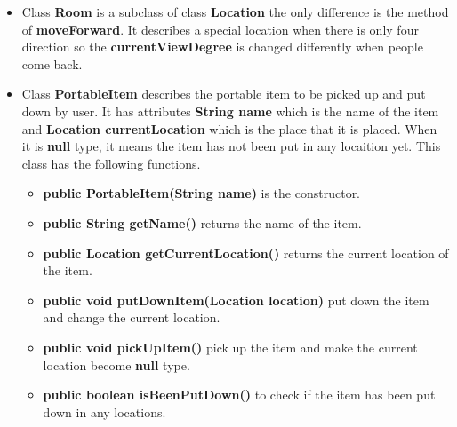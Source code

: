 \documentclass[11pt]{article}
\begin{document}
\begin{itemize}
\begin{itemize}
	\end{itemize}
	
	\item Class {\bf Room} is a subclass of class {\bf Location} the only difference is the method of {\bf moveForward}. It describes a special location when there is only four direction so the {\bf currentViewDegree} is changed differently when people come back.
	\item Class {\bf PortableItem} describes the portable item to be picked up and put down by user. It has attributes {\bf String name} which is the name of the item and {\bf Location currentLocation } which is the place that it is placed. When it is {\bf null} type, it means the item has not been put in any locaition yet. This class has the following functions.
		\begin{itemize}
			\item {\bf public PortableItem(String name)} is the constructor.
			\item {\bf public String getName()} returns the name of the item.
			\item {\bf public Location getCurrentLocation()} returns the current location of the item.
			\item {\bf public void putDownItem(Location location)} put down the item and change the current location.
			\item {\bf public void pickUpItem()} pick up the item and make the current location become {\bf null} type.
			\item {\bf public boolean isBeenPutDown()} to check if the item has been put down in any locations.
		\end{itemize}


\end{itemize}
\end{document}
